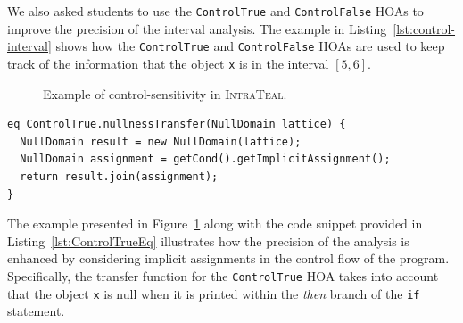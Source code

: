 We also asked students to use the \texttt{ControlTrue} and \texttt{ControlFalse} 
HOAs to improve the precision of the interval analysis. The example in
Listing~\ref{lst:control-interval} shows how the \texttt{ControlTrue} and \texttt{ControlFalse}
HOAs are used to keep track of the information that the object \texttt{x} is in the interval $[5,6]$.
\begin{figure}
	\centering
	\caption{\label{fig:ExampleTEAL} Example of control-sensitivity in \textsc{IntraTeal}.}
\end{figure}
\begin{lstlisting}[language=JastAdd,label={lst:ControlTrueEq}, caption={Transfer function for \texttt{ControlTrue} HOA.}]
eq ControlTrue.nullnessTransfer(NullDomain lattice) {
  NullDomain result = new NullDomain(lattice);
  NullDomain assignment = getCond().getImplicitAssignment();
  return result.join(assignment);
}
\end{lstlisting}
The example presented in Figure~\ref{fig:ExampleTEAL} along with the code snippet
provided in Listing~\ref{lst:ControlTrueEq} illustrates how the precision of the
analysis is enhanced by considering implicit assignments in the control flow of 
the program. Specifically, the transfer function for the \texttt{ControlTrue} HOA
takes into account that the object \texttt{x} is null when it is printed within 
the \emph{then} branch of the \texttt{if} statement.


